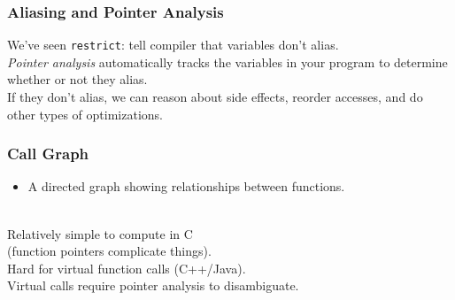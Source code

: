 \documentclass[aspectratio=43]{beamer}
\newenvironment{changemargin}[1]{%
  \begin{list}{}{%
    \setlength{\topsep}{0pt}%
    \setlength{\leftmargin}{#1}%
    \setlength{\rightmargin}{1em}
    \setlength{\listparindent}{\parindent}%
    \setlength{\itemindent}{\parindent}%
    \setlength{\parsep}{\parskip}%
  }%
  \item[]}{\end{list}}
\begin{document}
\begin{frame}
  \frametitle{Aliasing and Pointer Analysis}

  \begin{changemargin}{1.5cm}

     We've seen {\tt restrict}: tell compiler that variables don't
      alias.\\[1em]

    {\it Pointer analysis} automatically tracks the variables in your program to
      determine whether or not they alias.\\[1em]
    
    If they don't alias, we can reason about side effects, reorder
    accesses, and do other types of optimizations.
  \end{changemargin}

\end{frame}

\begin{frame}
  \frametitle{Call Graph}
  
  \begin{changemargin}{1.5cm}
\begin{itemize}
\item     A directed graph showing relationships between functions.
\end{itemize}
~\\
     Relatively simple to compute in C\\\qquad (function pointers complicate things).\\

     Hard for virtual function calls (C++/Java).\\[1em]

     Virtual calls require pointer analysis to disambiguate.
  \end{changemargin}
\end{frame}
\end{document}
